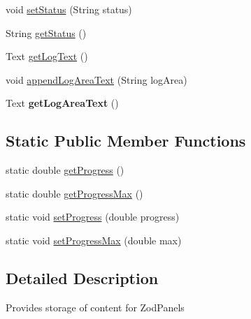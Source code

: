 \begin{DoxyCompactItemize}
\item 
void \hyperlink{classcom_1_1casual__dev_1_1zodui_1_1contentpanel_1_1_zod_panel_content_a050629b81050c7c8d5a7434990edd80a}{set\-Status} (String status)
\item 
String \hyperlink{classcom_1_1casual__dev_1_1zodui_1_1contentpanel_1_1_zod_panel_content_a34bf3cff9b56d261efccdf6d0f78761f}{get\-Status} ()
\item 
Text \hyperlink{classcom_1_1casual__dev_1_1zodui_1_1contentpanel_1_1_zod_panel_content_ac0d3cc1678c2a1e0fc8eb62873f6f254}{get\-Log\-Text} ()
\item 
void \hyperlink{classcom_1_1casual__dev_1_1zodui_1_1contentpanel_1_1_zod_panel_content_af18b3770c1e6577c7d0cbec6000e1cae}{append\-Log\-Area\-Text} (String log\-Area)
\item 
\hypertarget{classcom_1_1casual__dev_1_1zodui_1_1contentpanel_1_1_zod_panel_content_aafcb3408ff7415aa2a562ba91de6bd98}{Text {\bfseries get\-Log\-Area\-Text} ()}\label{classcom_1_1casual__dev_1_1zodui_1_1contentpanel_1_1_zod_panel_content_aafcb3408ff7415aa2a562ba91de6bd98}

\end{DoxyCompactItemize}
\subsection*{Static Public Member Functions}
\begin{DoxyCompactItemize}
\item 
static double \hyperlink{classcom_1_1casual__dev_1_1zodui_1_1contentpanel_1_1_zod_panel_content_aa0a8b8e42a87c34f5f080ebfec99cbb9}{get\-Progress} ()
\item 
static double \hyperlink{classcom_1_1casual__dev_1_1zodui_1_1contentpanel_1_1_zod_panel_content_ad311c87668be743bc2a41bf7db98a769}{get\-Progress\-Max} ()
\item 
static void \hyperlink{classcom_1_1casual__dev_1_1zodui_1_1contentpanel_1_1_zod_panel_content_ac675f2be1f3d16e2e160f2105e082a18}{set\-Progress} (double progress)
\item 
static void \hyperlink{classcom_1_1casual__dev_1_1zodui_1_1contentpanel_1_1_zod_panel_content_a3771302e0cc60e0d724cf1b6d0478c08}{set\-Progress\-Max} (double max)
\end{DoxyCompactItemize}


\subsection{Detailed Description}
Provides storage of content for Zod\-Panels

